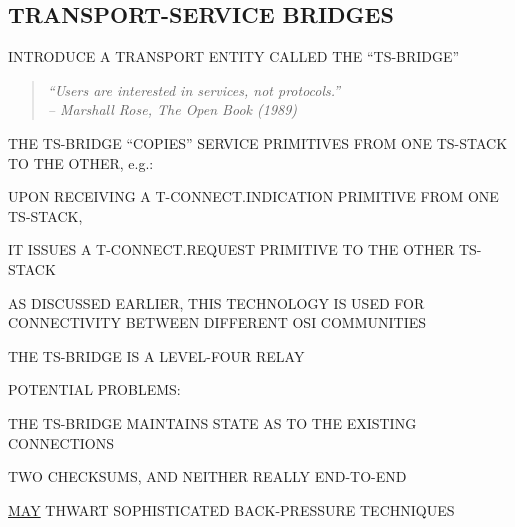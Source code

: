 \begin{bwslide}
\part*	{TRANSPORT-SERVICE BRIDGES}\bf

\begin{nrtc}
\item	INTRODUCE A TRANSPORT ENTITY CALLED THE ``TS-BRIDGE''
\begin{quote}\em
``Users are interested in services, not protocols.''\\ \raggedleft
-- Marshall Rose, The Open Book (1989)
\end{quote}

\item	THE TS-BRIDGE ``COPIES'' SERVICE PRIMITIVES FROM ONE TS-STACK TO THE
	OTHER, e.g.:
    \begin{nrtc}
    \item	UPON RECEIVING A T-CONNECT.INDICATION PRIMITIVE FROM ONE
		TS-STACK,

    \item	IT ISSUES A T-CONNECT.REQUEST PRIMITIVE TO THE OTHER TS-STACK
    \end{nrtc}

\item	AS DISCUSSED EARLIER, THIS TECHNOLOGY IS USED FOR CONNECTIVITY BETWEEN
	DIFFERENT OSI COMMUNITIES
\end{nrtc}
\end{bwslide}






\begin{bwslide}

\begin{nrtc}
\item	THE TS-BRIDGE IS A LEVEL-FOUR RELAY

\item	POTENTIAL PROBLEMS:
    \begin{nrtc}
    \item	THE TS-BRIDGE MAINTAINS STATE AS TO THE EXISTING CONNECTIONS

    \item	TWO CHECKSUMS, AND NEITHER REALLY END-TO-END

    \item	\underline{MAY} THWART SOPHISTICATED BACK-PRESSURE TECHNIQUES
    \end{nrtc}
\end{nrtc}
\end{bwslide}



